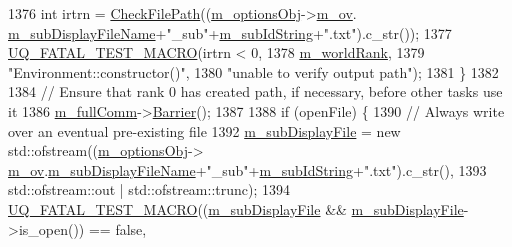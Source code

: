 \begin{DoxyCode}
{1376 \textcolor{comment}{}    \textcolor{keywordtype}{int} irtrn = \hyperlink{namespace_q_u_e_s_o_abc55c11f68bb99c4eba88030f1164764}{CheckFilePath}((\hyperlink{class_q_u_e_s_o_1_1_base_environment_aa91c7ac0ab11472bafb0ae4ac36d2194}{m\_optionsObj}->\hyperlink{class_q_u_e_s_o_1_1_environment_options_a97de0e8029b2d567643ab2b1b6ba2b9c}{m\_ov}.
      \hyperlink{class_q_u_e_s_o_1_1_env_options_values_ae92ff6d68751d90fd6fbb7de98e66ef2}{m\_subDisplayFileName}+\textcolor{stringliteral}{"\_sub"}+\hyperlink{class_q_u_e_s_o_1_1_base_environment_a19243150a58181cbdaf58b1bacd90009}{m\_subIdString}+\textcolor{stringliteral}{".txt"}).c\_str());
1377     \hyperlink{_defines_8h_a56d63d18d0a6d45757de47fcc06f574d}{UQ\_FATAL\_TEST\_MACRO}(irtrn < 0,
1378                         \hyperlink{class_q_u_e_s_o_1_1_base_environment_a464cab923ada0e14c6e3a4000c2ea385}{m\_worldRank},
1379                         \textcolor{stringliteral}{"Environment::constructor()"},
1380                         \textcolor{stringliteral}{"unable to verify output path"});
1381   \}
1382 
1384   \textcolor{comment}{// Ensure that rank 0 has created path, if necessary, before other tasks use it}
1386 \textcolor{comment}{}  \hyperlink{class_q_u_e_s_o_1_1_base_environment_a8e80c9067b0875c419f1b9ecccbdb46d}{m\_fullComm}->\hyperlink{class_q_u_e_s_o_1_1_mpi_comm_a4059971c30e023b272fccaa6aa00c426}{Barrier}(); 
1387 
1388   \textcolor{keywordflow}{if} (openFile) \{
1390     \textcolor{comment}{// Always write over an eventual pre-existing file}
1392 \textcolor{comment}{}    \hyperlink{class_q_u_e_s_o_1_1_base_environment_a52b4275aa8ee85994dd304d9fe95c9c5}{m\_subDisplayFile} = \textcolor{keyword}{new} std::ofstream((\hyperlink{class_q_u_e_s_o_1_1_base_environment_aa91c7ac0ab11472bafb0ae4ac36d2194}{m\_optionsObj}->
      \hyperlink{class_q_u_e_s_o_1_1_environment_options_a97de0e8029b2d567643ab2b1b6ba2b9c}{m\_ov}.\hyperlink{class_q_u_e_s_o_1_1_env_options_values_ae92ff6d68751d90fd6fbb7de98e66ef2}{m\_subDisplayFileName}+\textcolor{stringliteral}{"\_sub"}+\hyperlink{class_q_u_e_s_o_1_1_base_environment_a19243150a58181cbdaf58b1bacd90009}{m\_subIdString}+\textcolor{stringliteral}{".txt"}).c\_str(),
1393                                          std::ofstream::out | std::ofstream::trunc);
1394     \hyperlink{_defines_8h_a56d63d18d0a6d45757de47fcc06f574d}{UQ\_FATAL\_TEST\_MACRO}((\hyperlink{class_q_u_e_s_o_1_1_base_environment_a52b4275aa8ee85994dd304d9fe95c9c5}{m\_subDisplayFile} && 
      \hyperlink{class_q_u_e_s_o_1_1_base_environment_a52b4275aa8ee85994dd304d9fe95c9c5}{m\_subDisplayFile}->is\_open()) == \textcolor{keyword}{false},
}
\end{DoxyCode}
